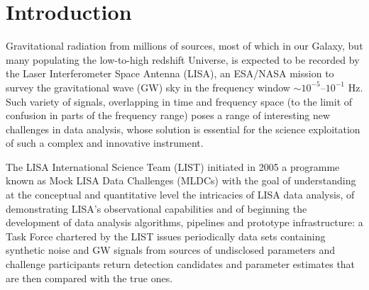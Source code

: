 \documentclass{iopart}
\begin{document}
\vspace{-18pt}


\section{Introduction}

Gravitational radiation from millions of sources, most of which in our Galaxy, but many populating the low-to-high redshift Universe, is expected to be recorded by the Laser Interferometer Space Antenna (LISA), an ESA/NASA mission to survey the gravitational wave (GW) sky in the frequency window $\sim 10^{-5}$--$10^{-1}$ Hz\cite{lisa}. Such variety of signals, overlapping in time and frequency space (to the limit of confusion in parts of the frequency range)  poses a range of interesting new challenges in data analysis, whose solution is essential for the science exploitation of such a complex and innovative instrument.



The LISA International Science Team (LIST) initiated in 2005 a programme known as Mock LISA Data Challenges (MLDCs) with the goal of understanding at the conceptual and quantitative level the intricacies of LISA data analysis, of demonstrating LISA's observational capabilities and of beginning the development of data analysis algorithms, pipelines and prototype infrastructure: a Task Force chartered by the LIST issues periodically data sets containing synthetic noise and GW signals from sources of undisclosed parameters and challenge participants return detection candidates and parameter estimates that are then compared with the true ones.
\end{document}
